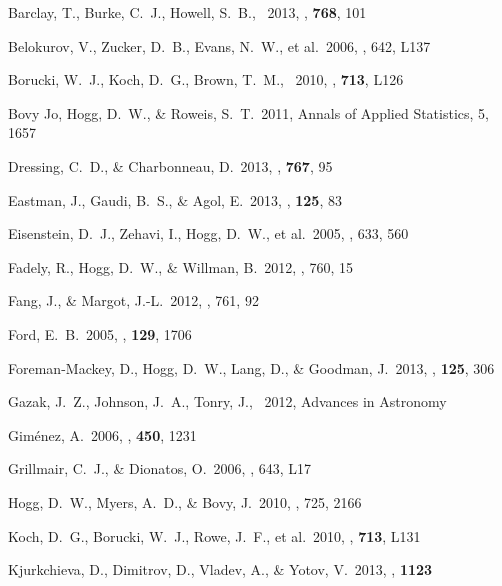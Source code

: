 \documentclass[letterpaper,12pt,preprint]{hack_aastex}
\begin{document}
\clearpage
\begin{thebibliography}{}\raggedright%

Barclay, T., Burke, C.~J., Howell, S.~B., \etal\ 2013, \apj, \textbf{768}, 101

Belokurov, V., Zucker, D.~B., Evans, N.~W., et al.\ 2006, \apjl, 642, L137

Borucki, W.~J., Koch, D.~G., Brown, T.~M., \etal\ 2010, \apjl,
\textbf{713}, L126

Bovy Jo, Hogg, D.~W., \& Roweis, S.~T.\ 2011, Annals of Applied Statistics,
5, 1657

Dressing, C.~D., \& Charbonneau, D.\ 2013, \apj, \textbf{767}, 95

Eastman, J., Gaudi, B.~S., \& Agol, E.\ 2013, \pasp, \textbf{125}, 83

Eisenstein, D.~J., Zehavi, I., Hogg, D.~W., et al.\ 2005, \apj, 633, 560

Fadely, R., Hogg, D.~W., \& Willman, B.\ 2012, \apj, 760, 15

Fang, J., \& Margot, J.-L.\ 2012, \apj, 761, 92

Ford, E.~B.\ 2005, \aj, \textbf{129}, 1706

Foreman-Mackey, D., Hogg, D.~W., Lang, D., \& Goodman, J.\ 2013,
\pasp, \textbf{125}, 306

Gazak, J.~Z., Johnson, J.~A., Tonry, J., \etal\ 2012, Advances in Astronomy

Gim{\'e}nez, A.\ 2006, \aap, \textbf{450}, 1231

Grillmair, C.~J., \& Dionatos, O.\ 2006, \apjl, 643, L17

Hogg, D.~W., Myers, A.~D., \& Bovy, J.\ 2010, \apj, 725, 2166

Koch, D.~G., Borucki, W.~J., Rowe, J.~F., et al.\ 2010, \apjl,
\textbf{713}, L131

Kjurkchieva, D., Dimitrov, D., Vladev, A., \& Yotov, V.\ 2013, \mnras,
\textbf{1123}


\end{thebibliography}
\end{document}
